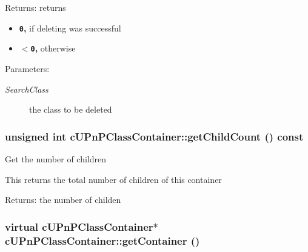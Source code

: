 \begin{Desc}
\item[Returns:]returns\begin{itemize}
\item {\bf {\tt 0},} if deleting was successful\item {\bf {\tt $<$0},} otherwise \end{itemize}
\end{Desc}
\begin{Desc}
\item[Parameters:]
\begin{description}
\item[{\em SearchClass}]the class to be deleted \end{description}
\end{Desc}
\hypertarget{classcUPnPClassContainer_b23a80cebe626e0b2b6c3b1a83b039c6}{
\subsubsection[{getChildCount}]{\setlength{\rightskip}{0pt plus 5cm}unsigned int cUPnPClassContainer::getChildCount () const}}
\label{classcUPnPClassContainer_b23a80cebe626e0b2b6c3b1a83b039c6}


Get the number of children

This returns the total number of children of this container

\begin{Desc}
\item[Returns:]the number of childen \end{Desc}
\hypertarget{classcUPnPClassContainer_32eb7f1d0b3821f0d9573fe59befdf10}{
\subsubsection[{getContainer}]{\setlength{\rightskip}{0pt plus 5cm}virtual {\bf cUPnPClassContainer}$\ast$ cUPnPClassContainer::getContainer ()}}
\label{classcUPnPClassContainer_32eb7f1d0b3821f0d9573fe59befdf10}


